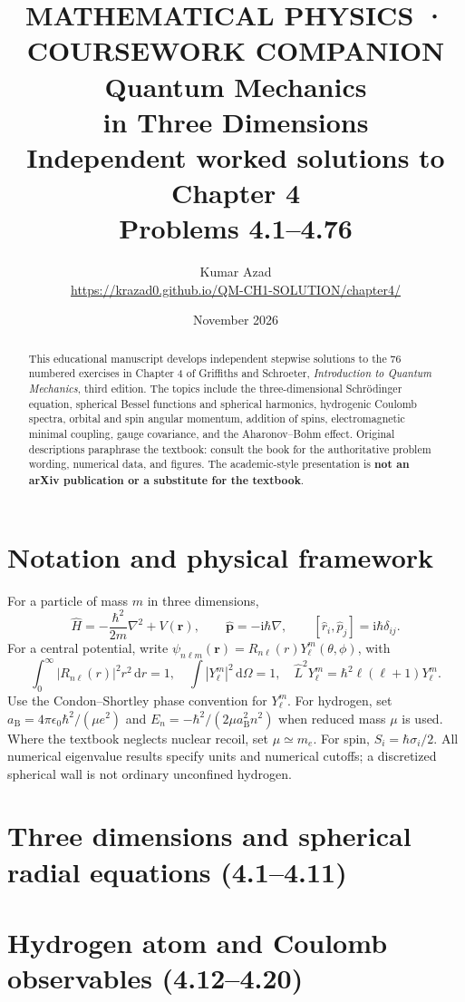 \documentclass[11pt,a4paper]{article}
\title{\textcolor{accent}{\large MATHEMATICAL PHYSICS · COURSEWORK COMPANION}\\[9pt]
\textbf{\Huge Quantum Mechanics\\in Three Dimensions}\\[11pt]
{\large Independent worked solutions to Chapter 4}\\[5pt]
{\normalsize Problems 4.1--4.76}}
\author{Kumar Azad\\\small\url{https://krazad0.github.io/QM-CH1-SOLUTION/chapter4/}}
\date{November 2026}
\numberwithin{equation}{section}
\newcommand{\dd}{\,\mathrm d}
\newcommand{\ii}{\mathrm i}
\newcommand{\aB}{a_{\mathrm B}}
\newcommand{\sh}{\hbar}
\begin{document}
\maketitle
\begin{abstract}
This educational manuscript develops independent stepwise solutions to the
76 numbered exercises in Chapter 4 of Griffiths and Schroeter,
\emph{Introduction to Quantum Mechanics}, third edition.
The topics include the three-dimensional Schrödinger equation,
spherical Bessel functions and spherical harmonics,
hydrogenic Coulomb spectra, orbital and spin angular momentum,
addition of spins, electromagnetic minimal coupling,
gauge covariance, and the Aharonov--Bohm effect.
Original descriptions paraphrase the textbook: consult the book for
the authoritative problem wording, numerical data, and figures.
The academic-style presentation is \textbf{not an arXiv publication
or a substitute for the textbook}.
\end{abstract}
\tableofcontents

\section{Notation and physical framework}
For a particle of mass $m$ in three dimensions,
\begin{equation}
\hat H=-\frac{\sh^2}{2m}\nabla^2+V(\mathbf r),\qquad
\hat{\mathbf p}=-\ii\sh\nabla,\qquad
[\hat r_i,\hat p_j]=\ii\sh\delta_{ij}.
\end{equation}
For a central potential, write
$\psi_{n\ell m}(\mathbf r)=R_{n\ell}(r)Y_\ell^m(\theta,\phi)$,
with
\begin{equation}
\int_0^\infty |R_{n\ell}(r)|^2r^2\dd r=1,\quad
\int|Y_\ell^m|^2\dd\Omega=1,\quad
\hat L^2Y_\ell^m=\sh^2\ell(\ell+1)Y_\ell^m.
\end{equation}
Use the Condon--Shortley phase convention for $Y_\ell^m$.
For hydrogen, set $\aB=4\pi\epsilon_0\sh^2/(\mu e^2)$
and $E_n=-\sh^2/(2\mu\aB^2n^2)$ when reduced mass
$\mu$ is used. Where the textbook neglects nuclear recoil,
set $\mu\simeq m_e$. For spin, $S_i=\sh\sigma_i/2$.
All numerical eigenvalue results specify units and numerical cutoffs;
a discretized spherical wall is not ordinary unconfined hydrogen.

\section{Three dimensions and spherical radial equations (4.1--4.11)}

\section{Hydrogen atom and Coulomb observables (4.12--4.20)}

\end{document}
